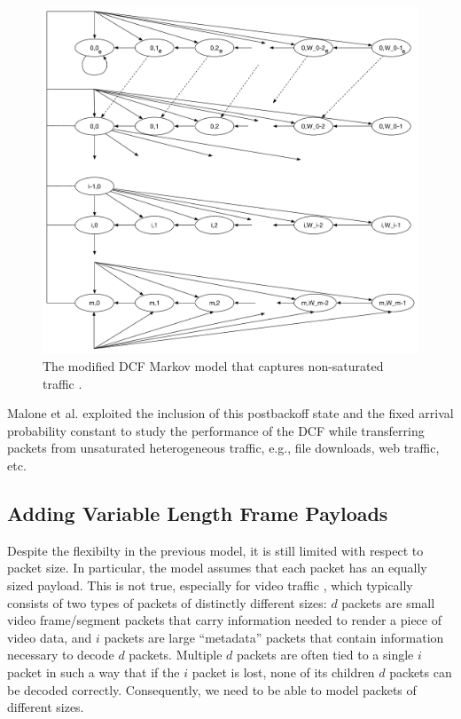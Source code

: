 \documentclass[conference]{IEEEtran}
\begin{document}
\begin{figure}
\begin{center}
\includegraphics[scale=0.5]{../sketches/dcf_model_nonsaturated.pdf}
\caption{The modified DCF Markov model that captures non-saturated traffic \cite{dcf-unsaturated}.}
\label{fig:dcf_model_nonsaturated}
\end{center}
\end{figure}

Malone et al. \cite{dcf-nonsaturated} exploited the inclusion of this postbackoff state and the fixed arrival probability constant to study the performance of the DCF while transferring packets from unsaturated heterogeneous traffic, e.g., file downloads, web traffic, etc.

\subsection{Adding Variable Length Frame Payloads}
Despite the flexibilty in the previous model, it is still limited with respect to packet size. In particular, the model assumes that each packet has an equally sized payload. This is not true, especially for video traffic \cite{???}, which typically consists of two types of packets of distinctly different sizes: $d$ packets are small video frame/segment packets that carry information needed to render a piece of video data, and $i$ packets are large ``metadata'' packets that contain information necessary to decode $d$ packets. Multiple $d$ packets are often tied to a single $i$ packet in such a way that if the $i$ packet is lost, none of its children $d$ packets can be decoded correctly. Consequently, we need to be able to model packets of different sizes. 
\end{document}

